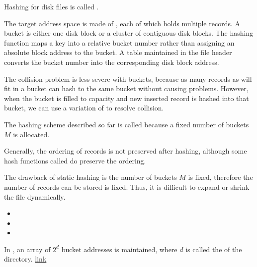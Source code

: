     \par Hashing for disk files is called .
    \par The target address space is made of , each of which holds multiple records. A bucket is either one disk block or a cluster of contiguous disk blocks. The hashing function maps a key into a relative bucket number rather than assigning an absolute block address to the bucket. A table maintained in the file header converts the bucket number into the corresponding disk block address.
    \par The collision problem is less severe with buckets, because as many records as will fit
in a bucket can hash to the same bucket without causing problems. However, when the bucket is filled to capacity and new inserted record is hashed into that bucket, we can use a variation of  to resolve collision.
    \par The hashing scheme described so far is called  because a fixed number of buckets $M$ is allocated.
    \par Generally, the ordering of records is not preserved after hashing, although some hash functions called  do preserve the ordering.
    \par The drawback of static hashing is the number of buckets $M$ is fixed, therefore the number of records can be stored is fixed. Thus, it is difficult to expand or shrink the file dynamically.

    \begin{itemize}
      \item {}
      \item {}
      \item {}
    \end{itemize}

      \par In , an array of $2^d$ bucket addresses is maintained, where $d$ is called the  of the directory.
      \href{https://www.youtube.com/watch?v=TtkN2xRAgv4}{link}



